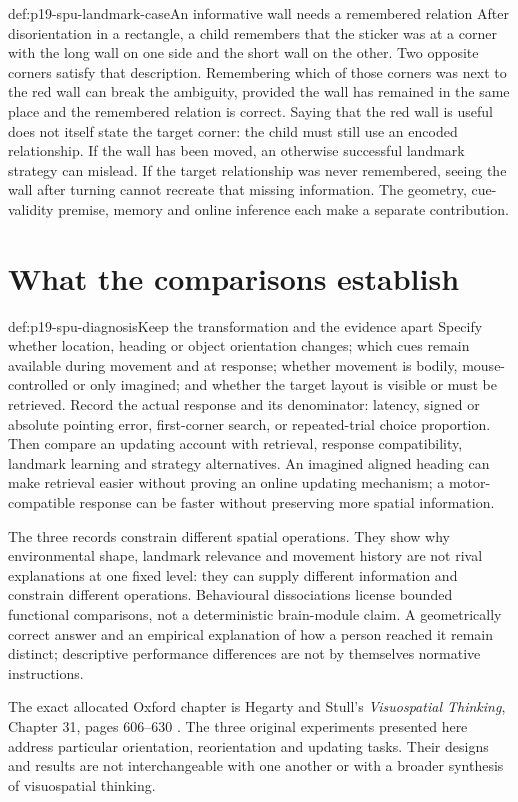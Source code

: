 \begin{hbexample}{def:p19-spu-landmark-case}{An informative wall needs a remembered relation}
After disorientation in a rectangle, a child remembers that the
sticker was at a corner with the long wall on one side and the
short wall on the other. Two opposite corners satisfy that
description. Remembering which of those corners was next to
the red wall can break the ambiguity, provided the wall has
remained in the same place and the remembered relation is correct.
Saying that the red wall is useful does not itself state the
target corner: the child must still use an encoded relationship.
If the wall has been moved, an otherwise successful landmark
strategy can mislead. If the target relationship was never
remembered, seeing the wall after turning cannot recreate that
missing information. The geometry, cue-validity premise, memory
and online inference each make a separate contribution.
\end{hbexample}

\section{What the comparisons establish}
\label{sec:p19-spu-boundaries}

\begin{hbmethod}{def:p19-spu-diagnosis}{Keep the transformation and the evidence apart}
Specify whether location, heading or object orientation changes;
which cues remain available during movement and at response;
whether movement is bodily, mouse-controlled or only imagined;
and whether the target layout is visible or must be retrieved.
Record the actual response and its denominator: latency, signed
or absolute pointing error, first-corner search, or repeated-trial
choice proportion.
Then compare an updating account with retrieval, response
compatibility, landmark learning and strategy alternatives.
An imagined aligned heading can make retrieval easier without
proving an online updating mechanism; a motor-compatible response
can be faster without preserving more spatial information.
\end{hbmethod}

The three records constrain different spatial operations.
They show why environmental shape, landmark relevance and
movement history are not rival explanations at one fixed level:
they can supply different information and constrain different
operations. Behavioural dissociations license bounded functional
comparisons, not a deterministic brain-module claim.
A geometrically correct answer and an empirical explanation of
how a person reached it remain distinct; descriptive performance
differences are not by themselves normative instructions.

The exact allocated Oxford chapter is Hegarty and Stull's
\emph{Visuospatial Thinking}, Chapter 31, pages 606--630
\cite{HegartyStull2012VisuospatialSPU}.
The three original experiments presented here address particular
orientation, reorientation and updating tasks. Their designs and results
are not interchangeable with one another or with a broader synthesis
of visuospatial thinking.

